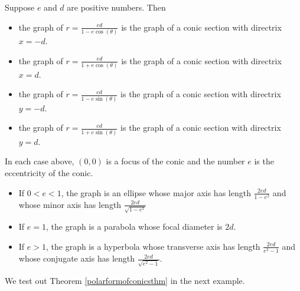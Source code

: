 \smallskip

\colorbox{ResultColor}{\bbm

\begin{thm}  \label{polarformofconicsthm}  Suppose $e$ and $d$ are positive numbers.  Then

\begin{itemize}

\item  the graph of $r = \frac{ed}{1 - e\cos(\theta)}$ is the graph of a conic section with directrix $x = -d$.

\item  the graph of $r = \frac{ed}{1 + e\cos(\theta)}$ is the graph of a conic section with directrix $x = d$.

\item  the graph of $r = \frac{ed}{1 - e\sin(\theta)}$ is the graph of a conic section with directrix $y = -d$.

\item  the graph of $r = \frac{ed}{1 + e\sin(\theta)}$ is the graph of a conic section with directrix $y = d$.


\end{itemize}

In each case above, $(0,0)$ is a focus of the conic and the number $e$ is the eccentricity of the conic. 

\begin{itemize}

\item If $0 < e < 1$, the graph is an ellipse whose major axis has length $\frac{2ed}{1-e^2}$ and whose minor axis has length $\frac{2ed}{\sqrt{1-e^2}}$

\item If $e = 1$, the graph is a parabola whose focal diameter is $2d$.

\item If $e > 1$, the graph is a hyperbola whose  transverse axis has length  $\frac{2ed}{e^2-1}$ and whose conjugate axis has length $\frac{2ed}{\sqrt{e^2-1}}$.

\end{itemize} 

\end{thm}

\ebm}

\smallskip

We test out Theorem \ref{polarformofconicsthm} in the next example.

